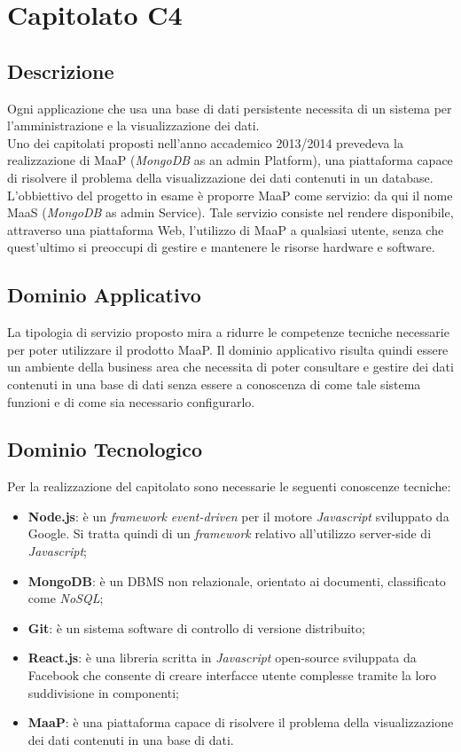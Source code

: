 \newpage
\section{Capitolato C4}
\subsection{Descrizione}
Ogni applicazione che usa una base di dati persistente necessita di un sistema per l'amministrazione e la visualizzazione dei dati.\\ Uno dei capitolati proposti nell'anno accademico 2013/2014 prevedeva la realizzazione di MaaP (\textit{MongoDB} as an admin Platform), una piattaforma capace di risolvere il problema della visualizzazione dei dati contenuti in un database.\\ 
L'obbiettivo del progetto in esame è proporre MaaP come servizio: da qui il nome MaaS (\textit{MongoDB} as admin Service). Tale servizio consiste nel rendere disponibile, attraverso una piattaforma Web, l'utilizzo di MaaP a qualsiasi utente, senza che quest'ultimo si preoccupi di gestire e mantenere le risorse hardware e software. 

\subsection{Dominio Applicativo}
La tipologia di servizio proposto mira a ridurre le competenze tecniche necessarie per poter utilizzare il prodotto MaaP. Il dominio applicativo risulta quindi essere un ambiente della business area che necessita di poter consultare e gestire dei dati contenuti in una base di dati senza essere a conoscenza di come tale sistema funzioni e di come sia necessario configurarlo. 

\subsection{Dominio Tecnologico}
Per la realizzazione del capitolato sono necessarie le seguenti conoscenze tecniche:
\begin{itemize}
	\item \textbf{Node.js}: è un \textit{framework} \textit{event-driven} per il motore \textit{Javascript} sviluppato da Google. Si tratta quindi di un \textit{framework} relativo all'utilizzo server-side di \textit{Javascript}; 
	\item \textbf{MongoDB}: è un DBMS non relazionale, orientato ai documenti, classificato come \textit{NoSQL};
	\item \textbf{Git}: è un sistema software di controllo di versione distribuito; 
	\item \textbf{React.js}: è una libreria scritta in \textit{Javascript} open-source sviluppata da Facebook che consente di creare interfacce utente complesse tramite la loro suddivisione in componenti; 
	\item \textbf{MaaP}: è una piattaforma capace di risolvere il problema della visualizzazione dei dati contenuti in una base di dati.	
\end{itemize}

